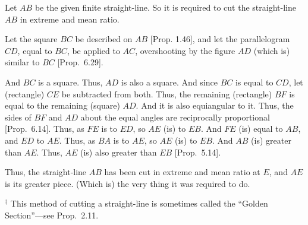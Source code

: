\begin{Parallel}{}{}
{\epsfysize=2.2in
\centerline{}

Let $AB$ be the given finite straight-line. So it is required to cut the straight-line $AB$ in extreme and mean ratio.

Let the square $BC$ be described on $AB$  [Prop. 1.46],
and let the parallelogram $CD$, equal to $BC$, be applied to $AC$,
overshooting by the figure $AD$ (which is) similar to $BC$ [Prop.~6.29].

And $BC$ is a square. Thus, $AD$ is also a square. And since $BC$ is equal to
$CD$, let (rectangle) $CE$ be subtracted from both. Thus, the remaining (rectangle) $BF$
is equal to the remaining (square) $AD$. And it is also equiangular to it. 
Thus, the sides of $BF$ and $AD$ about the equal angles are reciprocally proportional [Prop.~6.14]. 
Thus, as $FE$ is to $ED$, so $AE$ (is) to $EB$. And $FE$ (is) equal to $AB$, and $ED$ to
$AE$. Thus, as $BA$ is to $AE$, so $AE$ (is) to $EB$.  And $AB$ (is)
 greater than $AE$. Thus, $AE$ (is) also greater than $EB$ [Prop.~5.14].
 
 Thus, the straight-line $AB$ has been cut in extreme and mean ratio at $E$,
 and $AE$ is its greater piece. (Which is) the very thing it was required to
 do.}
\end{Parallel}
{\footnotesize\noindent$^\dag$ This method of cutting a straight-line
is sometimes called the ``Golden Section''---see Prop.~2.11.}

